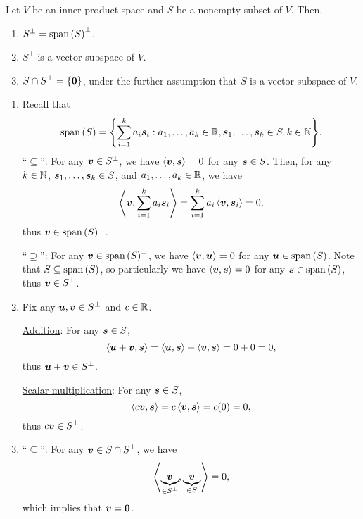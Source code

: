 \begin{enumerate}
\begin{proposition}
\label{prp:orthog-comp-prop}
Let \(V\) be an inner product space and \(S\) be a nonempty subset of \(V\). Then,
\begin{enumerate}
\item \(S^{\perp}=\operatorname{span}\qty(S)^{\perp}\).
\item \(S^{\perp}\) is a vector subspace of \(V\).
\item \(S\cap S^{\perp}=\{\vb*{0}\}\), under the further assumption that \(S\) is a vector subspace of \(V\).
\end{enumerate}
\end{proposition}
\begin{pf}
\begin{enumerate}
\item Recall that
\[
\operatorname{span}\qty(S)=\qty{\sum_{i=1}^{k}a_i\vb*{s}_i:a_1,\dotsc,a_k\in\mathbb{R}, \vb*{s}_1,\dotsc,\vb*{s}_k\in S, k\in\mathbb{N}}.
\]
``\(\subseteq\)'': For any \(\vb*{v}\in S^{\perp}\), we have
\(\left\langle \vb*{v},\vb*{s}\right\rangle=0\) for any \(\vb*{s}\in S\). Then, for any
\(k\in\mathbb{N}\), \(\vb*{s}_1,\dotsc,\vb*{s}_k\in S\), and \(a_1,\dotsc,a_k\in\mathbb{R}\),
we have
\[
\left\langle \vb*{v},\sum_{i=1}^{k}a_i\vb*{s}_i\right\rangle
=\sum_{i=1}^{k}a_i\left\langle \vb*{v},\vb*{s}_i\right\rangle
=0,
\]
thus \(\vb*{v}\in\operatorname{span}\qty(S)^{\perp}\).

``\(\supseteq\)'': For any \(\vb*{v}\in\operatorname{span}\qty(S)^{\perp}\), we have
\(\left\langle \vb*{v},\vb*{u}\right\rangle=0\) for any \(\vb*{u}\in\operatorname{span}\qty(S)\). Note that
\(S\subseteq \operatorname{span}\qty(S)\), so particularly we have \(\left\langle \vb*{v},\vb*{s}\right\rangle=0\)
for any \(\vb*{s}\in\operatorname{span}\qty(S)\), thus \(\vb*{v}\in S^{\perp}\).

\item Fix any \(\vb*{u},\vb*{v}\in S^{\perp}\) and \(c\in\mathbb{R}\).

\underline{Addition}: For any \(\vb*{s}\in S\),
\[
\left\langle \vb*{u}+\vb*{v},\vb*{s}\right\rangle
=\left\langle \vb*{u},\vb*{s}\right\rangle
+\left\langle \vb*{v},\vb*{s}\right\rangle
=0+0=0,
\]
thus \(\vb*{u}+\vb*{v}\in S^{\perp}\).

\underline{Scalar multiplication}: For any \(\vb*{s}\in S\),
\[
\left\langle c\vb*{v},\vb*{s}\right\rangle=c\left\langle \vb*{v},\vb*{s}\right\rangle=c(0)=0,
\]
thus \(c\vb*{v}\in S^{\perp}\).

\item ``\(\subseteq\)'': For any \(\vb*{v}\in S\cap S^{\perp}\), we have
\[
\left\langle \underbrace{\vb*{v}}_{\in S^{\perp}},\underbrace{\vb*{v}}_{\in S}\right\rangle
=0,
\]
which implies that \(\vb*{v}=\vb*{0}\).


\end{enumerate}
\end{pf}
\end{enumerate}
